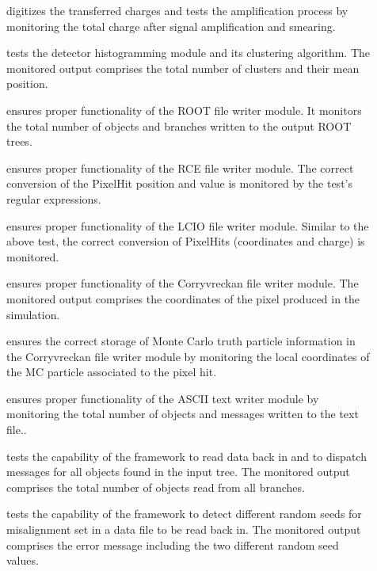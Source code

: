 \begin{description}
    \item[] digitizes the transferred charges and tests the amplification process by monitoring the total charge after signal amplification and smearing.
    \item[] tests the detector histogramming module and its clustering algorithm. The monitored output comprises the total number of clusters and their mean position.
    \item[] ensures proper functionality of the ROOT file writer module. It monitors the total number of objects and branches written to the output ROOT trees.
    \item[] ensures proper functionality of the RCE file writer module. The correct conversion of the PixelHit position and value is monitored by the test's regular expressions.
    \item[] ensures proper functionality of the LCIO file writer module. Similar to the above test, the correct conversion of PixelHits (coordinates and charge) is monitored.
    \item[] ensures proper functionality of the Corryvreckan file writer module. The monitored output comprises the coordinates of the pixel produced in the simulation.
    \item[] ensures the correct storage of Monte Carlo truth particle information in the Corryvreckan file writer module by monitoring the local coordinates of the MC particle associated to the pixel hit.
    \item[] ensures proper functionality of the ASCII text writer module by monitoring the total number of objects and messages written to the text file..
    \item[] tests the capability of the framework to read data back in and to dispatch messages for all objects found in the input tree. The monitored output comprises the total number of objects read from all branches.
    \item[] tests the capability of the framework to detect different random seeds for misalignment set in a data file to be read back in. The monitored output comprises the error message including the two different random seed values.
\end{description}

